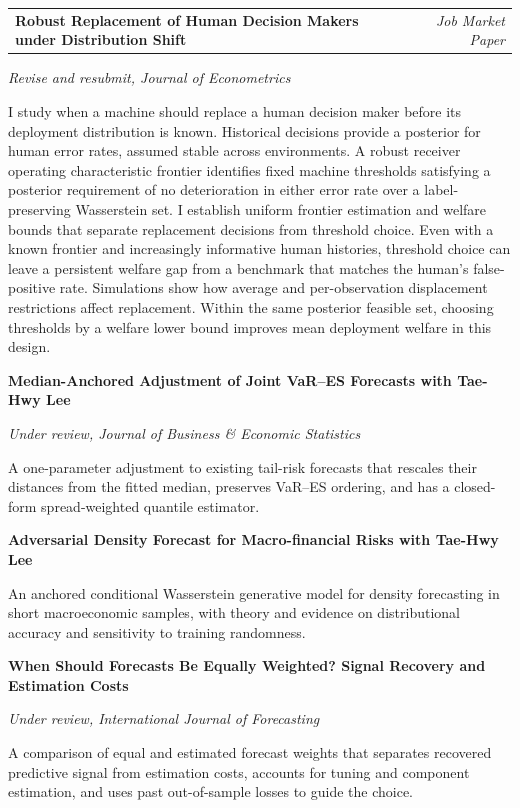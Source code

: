 \documentclass[11pt,letterpaper]{article}
\newcommand{\paper}[3]{\needspace{6\baselineskip}\textbf{#1}\par {#2}\par {\small #3}\par}
\begin{document}
\begin{tabularx}{\textwidth}{@{}Xr@{}}
\textbf{Robust Replacement of Human Decision Makers under Distribution Shift}
& \textit{Job Market Paper}
\end{tabularx}
{\textit{Revise and resubmit, Journal of Econometrics}}\par
{\small
I study when a machine should replace a human decision maker before its deployment distribution is known. Historical
decisions provide a posterior for human error rates, assumed stable across environments. A robust receiver operating
characteristic frontier identifies fixed machine thresholds satisfying a posterior requirement of no deterioration in either
error rate over a label-preserving Wasserstein set. I establish uniform frontier estimation and welfare bounds that separate
replacement decisions from threshold choice. Even with a known frontier and increasingly informative human histories,
threshold choice can leave a persistent welfare gap from a benchmark that matches the human's false-positive rate. Simulations
show how average and per-observation displacement restrictions affect replacement. Within the same posterior feasible set,
choosing thresholds by a welfare lower bound improves mean deployment welfare in this design.
}\par

\vspace{6pt}

\paper
{Median-Anchored Adjustment of Joint VaR--ES Forecasts
 {\small\textnormal{with Tae-Hwy Lee}}}
{\textit{Under review, Journal of Business \& Economic Statistics}}
{A one-parameter adjustment to existing tail-risk forecasts that rescales their
distances from the fitted median, preserves VaR--ES ordering, and has a closed-form
spread-weighted quantile estimator.}

\vspace{6pt}

\paper
{Adversarial Density Forecast for Macro-financial Risks
 {\small\textnormal{with Tae-Hwy Lee}}}
{}
{An anchored conditional Wasserstein generative model for density forecasting in
short macroeconomic samples, with theory and evidence on distributional accuracy
and sensitivity to training randomness.}

\vspace{6pt}

\paper
{When Should Forecasts Be Equally Weighted? Signal Recovery and Estimation Costs}
{\textit{Under review, International Journal of Forecasting}}
{A comparison of equal and estimated forecast weights that separates recovered
predictive signal from estimation costs, accounts for tuning and component estimation,
and uses past out-of-sample losses to guide the choice.}
\end{document}
